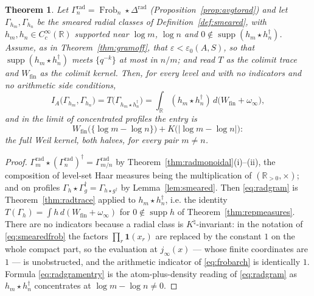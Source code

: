 \documentclass[11pt]{amsart}
\newtheorem{theorem}{Theorem}[section]
\theoremstyle{definition}
\theoremstyle{remark}
\newcommand{\R}{\mathbb R}
\newcommand{\Frob}{\operatorname{Frob}}
\newcommand{\supp}{\operatorname{supp}}
\newcommand{\Knat}{K^{\natural}}
\newcommand{\Wfin}{W_{\mathrm{fin}}}
\begin{document}
\begin{theorem}\label{thm:fullweil}
Let $\Gamma_n^{\mathrm{rad}}=\Frob_n\star\Delta^{\mathrm{rad}}$
(Proposition~\ref{prop:avgtorad}) and let $\Gamma_{h_m},\Gamma_{h_n}$ be the
smeared radial classes of Definition~\ref{def:smeared}, with $h_m,h_n\in
C_c^\infty(\R)$ supported near $\log m$, $\log n$ and $0\notin
\supp(h_m\star h_n^\dagger)$. Assume, as in Theorem~\ref{thm:gramoff}, that
$\varepsilon<\varepsilon_0(A,S)$, so that $\supp(h_m\star h_n^\dagger)$ meets
$\{q^{-k}\}$ at most in $n/m$; and read $T$ as the colimit trace and $\Wfin$ as
the colimit kernel. Then, for \emph{every} level and with \emph{no indicators
and no arithmetic side conditions},
\begin{equation}\label{eq:radgram}
  I_A\bigl(\Gamma_{h_m},\Gamma_{h_n}\bigr)=T\bigl(\Gamma_{h_m\star h_n^\dagger}
   \bigr)=\int_\R(h_m\star h_n^\dagger)\,d\bigl(\Wfin+\omega_\infty\bigr),
\end{equation}
and in the limit of concentrated profiles the entry is
\begin{equation}\label{eq:radgramentry}
  \Wfin\bigl(\{\log m-\log n\}\bigr)+K\bigl(|\log m-\log n|\bigr):
\end{equation}
the full Weil kernel, both halves, for every pair $m\ne n$.
\end{theorem}

\begin{proof}
$\Gamma_m^{\mathrm{rad}}\star(\Gamma_n^{\mathrm{rad}})^\dagger
=\Gamma_{m/n}^{\mathrm{rad}}$ by Theorem~\ref{thm:radmonoidal}(i)--(ii), the
composition of level-set Haar measures being the multiplication of
$(\R_{>0},\times)$; and on profiles $\Gamma_h\star\Gamma_g^\dagger
=\Gamma_{h\star g^\dagger}$ by Lemma~\ref{lem:smeared}. Then \eqref{eq:radgram}
is Theorem~\ref{thm:radtrace} applied to $h_m\star h_n^\dagger$, i.e. the
identity $T(\Gamma_h)=\int h\,d(\Wfin+\omega_\infty)$ for
$0\notin\supp h$ of Theorem~\ref{thm:repmeasures}. There are no indicators
because a radial class is $\Knat$-invariant: in the notation of
\eqref{eq:smearedfrob} the factors $\prod_r\mathbf 1(x_r)$ are replaced by the
constant $1$ on the whole compact part, so the evaluation at $j_\infty(x)$ ---
whose finite coordinates are $1$ --- is unobstructed, and the arithmetic
indicator of \eqref{eq:frobarch} is identically $1$. Formula
\eqref{eq:radgramentry} is the atom-plus-density reading of \eqref{eq:radgram}
as $h_m\star h_n^\dagger$ concentrates at $\log m-\log n\ne0$.
\end{proof}
\end{document}
